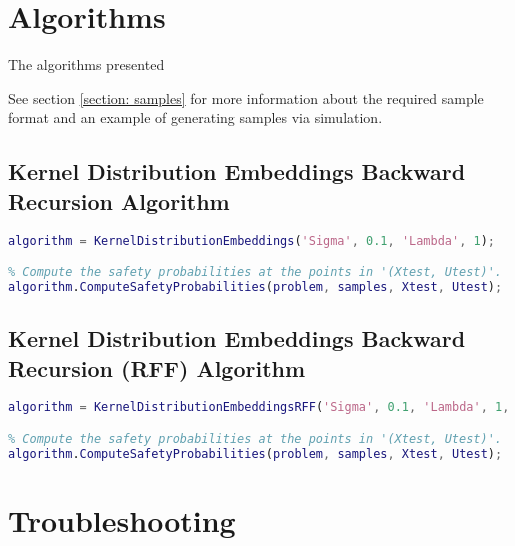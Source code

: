\documentclass[11pt]{article}
\begin{document}

\section{Algorithms}
\label{section: algorithms}

The algorithms presented

See section \ref{section: samples} for more information about the required sample format and an example of generating samples via simulation.


\subsection{Kernel Distribution Embeddings Backward Recursion Algorithm}

\begin{lstlisting}[language=Matlab]
% Define the algorithm Kernel Distribution Embeddings
algorithm = KernelDistributionEmbeddings('Sigma', 0.1, 'Lambda', 1);

% Compute the safety probabilities at the points in '(Xtest, Utest)'.
algorithm.ComputeSafetyProbabilities(problem, samples, Xtest, Utest);
\end{lstlisting}



\subsection{Kernel Distribution Embeddings Backward Recursion (RFF) Algorithm}

\begin{lstlisting}[language=Matlab]
% Define the algorithm Kernel Distribution Embeddings (RFF)
algorithm = KernelDistributionEmbeddingsRFF('Sigma', 0.1, 'Lambda', 1, 'D', 1000);

% Compute the safety probabilities at the points in '(Xtest, Utest)'.
algorithm.ComputeSafetyProbabilities(problem, samples, Xtest, Utest);
\end{lstlisting}



\section{Troubleshooting}
\end{document}
